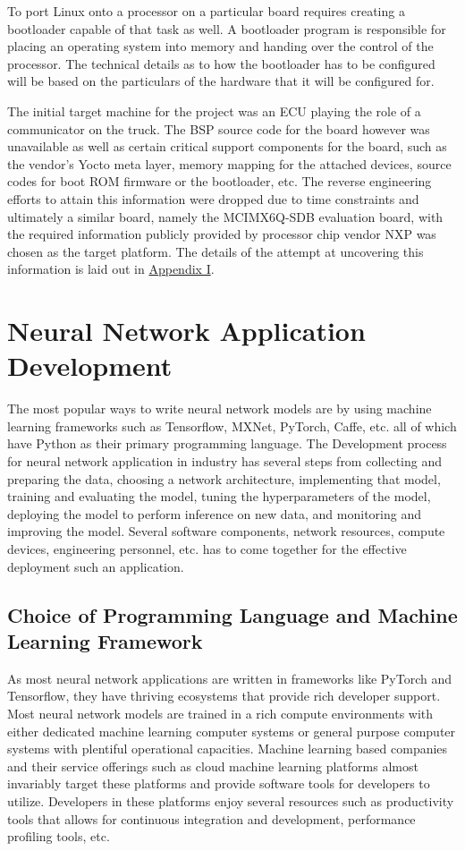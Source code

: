 To port Linux onto a processor on a particular board requires creating a bootloader capable of that task as well. A bootloader program is responsible for placing an operating system into memory and handing over the control of the processor. The technical details as to how the bootloader has to be configured will be based on the particulars of the hardware that it will be configured for.

The initial target machine for the project was an ECU playing the role of a communicator on the truck. The BSP source code for the board however was unavailable as well as certain critical support components for the board, such as the vendor's Yocto meta layer, memory mapping for the attached devices, source codes for boot ROM firmware or the bootloader, etc. The reverse engineering efforts to attain this information were dropped due to time constraints and ultimately a similar board, namely the MCIMX6Q-SDB evaluation board, with the required information publicly provided by processor chip vendor NXP was chosen as the target platform. The details of the attempt at uncovering this information is laid out in \hyperref[rtc-c300]{Appendix I}.

\section{Neural Network Application Development}

The most popular ways to write neural network models are by using machine learning frameworks such as Tensorflow, MXNet, PyTorch, Caffe, etc. all of which have Python as their primary programming language. The Development process for neural network application in industry has several steps from collecting and preparing the data, choosing a network architecture, implementing that model, training and evaluating the model, tuning the hyperparameters of the model, deploying the model to perform inference on new data, and monitoring and improving the model. Several software components, network resources, compute devices, engineering personnel, etc. has to come together for the effective deployment such an application.

\subsection{Choice of Programming Language and Machine Learning Framework}

As most neural network applications are written in frameworks like PyTorch and Tensorflow, they have thriving ecosystems that provide rich developer support. Most neural network models are trained in a rich compute environments with either dedicated machine learning computer systems or general purpose computer systems with plentiful operational capacities. Machine learning based companies and their service offerings such as cloud machine learning platforms almost invariably target these platforms and provide software tools for developers to utilize. Developers in these platforms enjoy several resources such as productivity tools that allows for continuous integration and development, performance profiling tools, etc.

